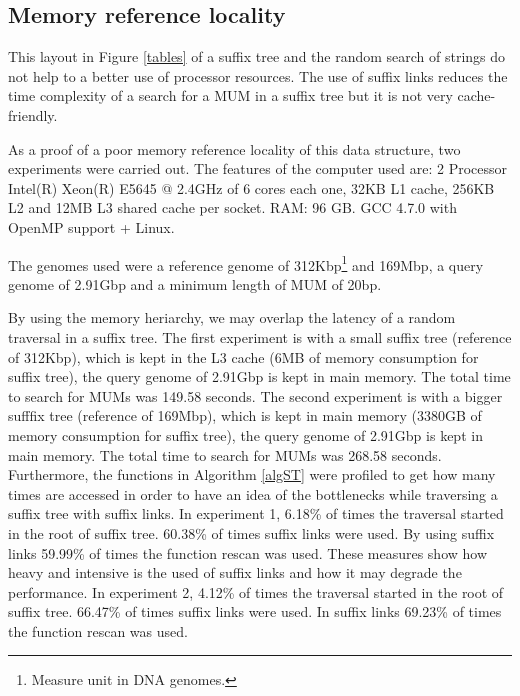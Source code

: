 \documentclass[conference]{IEEEtran}
\begin{document}
\subsection{Memory reference locality}
This layout in Figure \ref{tables} of a suffix tree and the random search of strings do not help to a better use of processor resources. The use of suffix links reduces the time complexity of a search for a MUM in a suffix tree but it is not very cache-friendly.

As a proof of a poor memory reference locality of this data structure, two experiments were carried out. The features of the computer used are: 2 Processor Intel(R) Xeon(R) E5645 @ 2.4GHz of 6 cores each one, 32KB L1 cache, 256KB L2 and 12MB L3 shared cache per socket. RAM: 96 GB. GCC 4.7.0 with OpenMP support + Linux.

The genomes used were a reference genome of 312Kbp\footnote{Measure unit in DNA genomes.} and 169Mbp, a query genome of 2.91Gbp and a minimum length of MUM of 20bp.

By using the memory heriarchy, we may overlap the latency of a random traversal in a suffix tree. The first experiment is with a small suffix tree (reference of 312Kbp), which is kept in the L3 cache (6MB of memory consumption for suffix tree), the query genome of 2.91Gbp is kept in main memory. The total time to search for MUMs was 149.58 seconds. The second experiment is with a bigger sufffix tree (reference of 169Mbp), which is kept in main memory (3380GB of memory consumption for suffix tree), the query genome of 2.91Gbp is kept in main memory. The total time to search for MUMs was 268.58 seconds. Furthermore, the functions in Algorithm \ref{algST} were profiled to get how many times are accessed in order to have an idea of the bottlenecks while traversing a suffix tree with suffix links. In experiment 1, 6.18\% of times the traversal started in the root of suffix tree. 60.38\% of times suffix links were used. By using suffix links 59.99\% of times the function rescan was used. These measures show how heavy and intensive is the used of suffix links and how it may degrade the performance. In experiment 2, 4.12\% of times the traversal started in the root of suffix tree. 66.47\% of times suffix links were used. In suffix links 69.23\% of times the function rescan was used.
 
\end{document}
